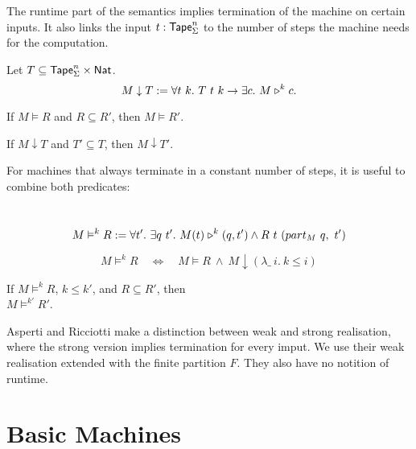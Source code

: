 The runtime part of the semantics implies termination of the machine on certain inputs.  It also links the input $t:\textsf{Tape}_\Sigma^n$ to the number of
steps the machine needs for the computation.

\begin{definition}
  \label{def:TerminatesIn}
  Let $T \subseteq \textsf{Tape}_\Sigma^n \times \textsf{Nat}$.
  \[
    M \downarrow T :=
    \forall t~k.~T~t~k \rightarrow
    \exists c.~M \mathrel{\triangleright}^k c.
  \]
\end{definition}


\begin{lemma}
  \label{lem:Realise_monotone}
  If $M \vDash R$ and $R \subseteq R'$, then $M \vDash R'$.
\end{lemma}

\begin{lemma}
  \label{lem:TerminatesIn_monotone}
  If $M \downarrow T$ and $T' \subseteq T$, then $M \downarrow T'$.
\end{lemma}


For machines that always terminate in a constant number of steps, it is useful to combine both predicates:
\begin{definition}
  \label{def:RealiseIn}
  ~
  \[
    M \vDash^k R :=
    \forall t'.~
    \exists q~t'.~
    M(t) \mathrel{\triangleright}^k(q, t') \land R~t~(part_M~q,~t')
  \]
\end{definition}

\begin{lemma}
  \label{lem:Realise_total}
  \[
    M \vDash^k R
    \quad\iff\quad
    M \vDash R ~\land~
    M \downarrow (\lambda \_~i.~k \le i)
  \]
\end{lemma}

\begin{lemma}
  \label{lem:RealiseIn_monotone}
  If $M \vDash^k R$, $k \leq k'$, and $R \subseteq R'$, then \\
  $M \vDash^{k'} R'$.
\end{lemma}

Asperti and Ricciotti \cite{asperti2015} make a distinction between weak and strong realisation, where the strong version implies termination for
every imput.  We use their weak realisation extended with the finite partition $F$.  They also have no notition of runtime.


\section{Basic Machines}
\label{sec:basic_machines}


